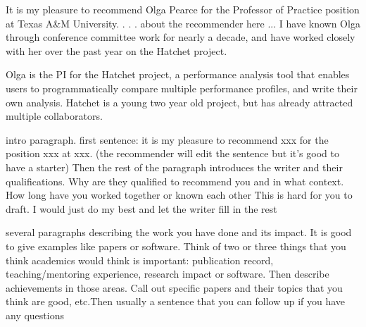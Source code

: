 \documentclass[12pt]{article}
\begin{document}
It is my pleasure to recommend Olga Pearce for the Professor of Practice position at Texas A\&M University.
. . . about the recommender here ...
I have known Olga through conference committee work for nearly a decade, and have worked closely with her over the past year on the Hatchet project.


Olga is the PI for the Hatchet project, a performance analysis tool that enables users to programmatically compare multiple performance profiles, and write their own analysis.  Hatchet is a young two year old project, but has already attracted multiple collaborators.




intro paragraph. first sentence: it is my pleasure to recommend xxx for the position xxx at xxx. (the recommender will edit the sentence but it's good to have a starter) Then the rest of the paragraph introduces the writer and their qualifications. Why are they qualified to recommend you and in what context. How long have you worked together or known each other This is hard for you to draft. I would just do my best and let the writer fill in the rest


several paragraphs describing the work you have done and its impact. It is good to give examples like papers or software. Think of two or three things that you think academics would think is important: publication record, teaching/mentoring experience, research impact or software. Then describe achievements in those areas. Call out specific papers and their topics that you think are good, etc.Then usually a sentence that you can follow up if you have any questions
\end{document}
